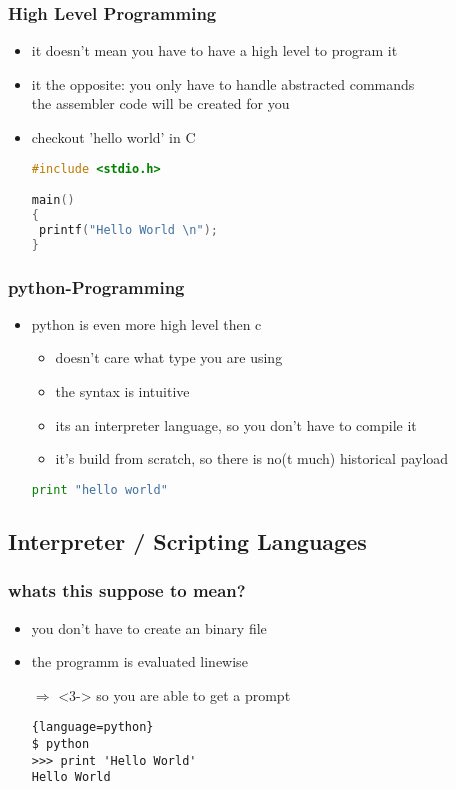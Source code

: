 \documentclass[handout]{beamer}
\begin{document}
		\begin{frame}[fragile]
			\frametitle{High Level Programming}
			\begin{itemize}
            	\item<1-> it doesn't mean you have to have a high level to program it
                \item<2-> it the opposite: you only have to handle abstracted commands \\
                          the assembler code will be created for you
                \item<3-> checkout 'hello world' in C
                \begin{lstlisting}[language=c]
#include <stdio.h>

main()
{
 printf("Hello World \n");
}
\end{lstlisting}
            \end{itemize}
		\end{frame}
		\begin{frame}[fragile]
			\frametitle{python-Programming}
			\begin{itemize}
            	\item<1-> python is even more high level then c
                \begin{itemize}
                    \item<2-> doesn't care what type you are using
                    \item<3-> the syntax is intuitive
                    \item<4-> its an interpreter language, so you don't have to compile it
                    \item<4-> it's build from scratch, so there is no(t much) historical payload
                \end{itemize}
                \begin{lstlisting}[language=python]
print "hello world"
\end{lstlisting}
            \end{itemize}
		\end{frame}

    \subsection{Interpreter / Scripting Languages} 
		\begin{frame}[fragile]
			\frametitle{whats this suppose to mean?}
			\begin{itemize}
                \item<1-> you don't have to create an binary file
                \item<2-> the programm is evaluated linewise
                \item[$\Rightarrow$]<3-> so you are able to get a prompt
                \begin{lstlisting}{language=python}
$ python
>>> print 'Hello World'
Hello World
\end{lstlisting}

            \end{itemize}
		\end{frame}
	
\end{document}
